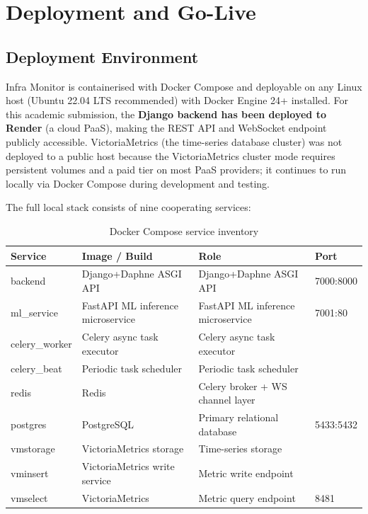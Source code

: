\chapter{Deployment and Go-Live}\label{ch:deploy}

\section{Deployment Environment}

Infra Monitor is containerised with Docker Compose and deployable on any
Linux host (Ubuntu 22.04 LTS recommended) with Docker Engine 24+ installed.
For this academic submission, the \textbf{Django backend has been deployed to
Render} (a cloud PaaS), making the REST API and WebSocket endpoint publicly
accessible.  VictoriaMetrics (the time-series database cluster) was not deployed
to a public host because the VictoriaMetrics cluster mode requires persistent
volumes and a paid tier on most PaaS providers; it continues to run locally
via Docker Compose during development and testing.

The full local stack consists of nine cooperating services:

\begin{table}[H]
\centering
\caption{Docker Compose service inventory}\label{tab:services}
\begin{tabularx}{\textwidth}{@{}l l X l@{}}
\toprule
\textbf{Service} & \textbf{Image / Build} & \textbf{Role} & \textbf{Port}\\
\midrule
backend        & Django+Daphne ASGI API & Django+Daphne ASGI API & 7000:8000\\
ml\_service    & FastAPI ML inference microservice & FastAPI ML inference microservice & 7001:80\\
celery\_worker & Celery async task executor & Celery async task executor & \\
celery\_beat   & Periodic task scheduler & Periodic task scheduler & \\
redis          & Redis     & Celery broker + WS channel layer & \\
postgres       & PostgreSQL        & Primary relational database & 5433:5432\\
vmstorage      & VictoriaMetrics storage & Time-series storage & \\
vminsert       & VictoriaMetrics write service  & Metric write endpoint & \\
vmselect       & VictoriaMetrics  & Metric query endpoint & 8481\\
\bottomrule
\end{tabularx}
\end{table}

